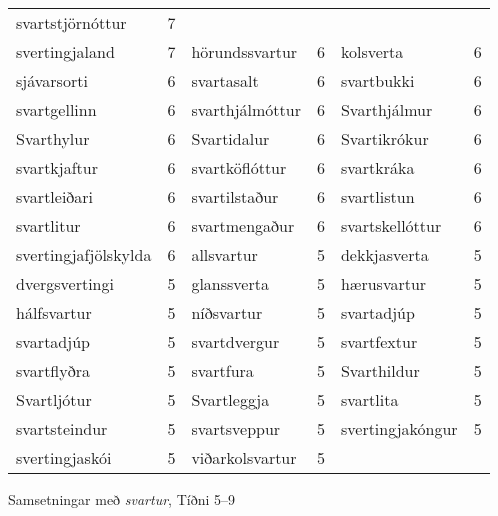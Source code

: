 \documentclass[../samsetningasafn.tex]{subfiles}
\begin{document}
\begin{wordlist}[H]
\begin{tcolorbox}
\begin{tabular}{BlBlBl}
		svartstjörnóttur & 7	\\ 
		svertingjaland & 7		& 	
		hörundssvartur & 6		& 
		kolsverta	& 6		\\ 	
		sjávarsorti	& 6		& 	
		svartasalt	& 6		& 		
		svartbukki	& 	6	\\ 	
		svartgellinn	& 	6	& 		
		svarthjálmóttur & 6		& 	
		Svarthjálmur	& 6		\\ 
		Svarthylur	& 6		& 	
		Svartidalur	& 6		& 	
		Svartikrókur	& 6		\\ 
		svartkjaftur	& 6		& 	
		svartköflóttur & 6		& 	
		svartkráka 	& 6		\\ 
		svartleiðari	& 6		& 	
		svartilstaður	& 6		& 
		svartlistun	& 6		\\ 	
		svartlitur	& 6		& 		
		svartmengaður & 6		& 	
		svartskellóttur & 6		\\ 
		svertingjafjölskylda & 6	& 
		allsvartur 	& 5		& 	
		dekkjasverta	& 5		\\ 
		dvergsvertingi & 	5	& 
		glanssverta	& 5		& 	
		hærusvartur & 5		\\ 
		hálfsvartur	& 5		& 	
		níðsvartur	& 5		& 	
		svartadjúp	& 5		\\ 	
		svartadjúp	& 5		& 	
		svartdvergur	&	5	& 
		svartfextur	& 5		\\ 
		svartflyðra	& 5		& 	
		svartfura	& 5		& 	
		Svarthildur	& 5		\\ 	
		Svartljótur	&	5	& 	
		Svartleggja	& 5		& 	
		svartlita	&	5	\\ 	
		svartsteindur & 	5	& 
		svartsveppur & 	5	& 
		svertingjakóngur & 	5	\\ 
		svertingjaskói & 	5	& 
		viðarkolsvartur & 	5	& 
	\end{tabular}
\end{tcolorbox}
	\caption{Samsetningar með \textit{svartur}, Tíðni 5--9}
	\label{listi:svart.5}
\end{wordlist}
\end{document}
